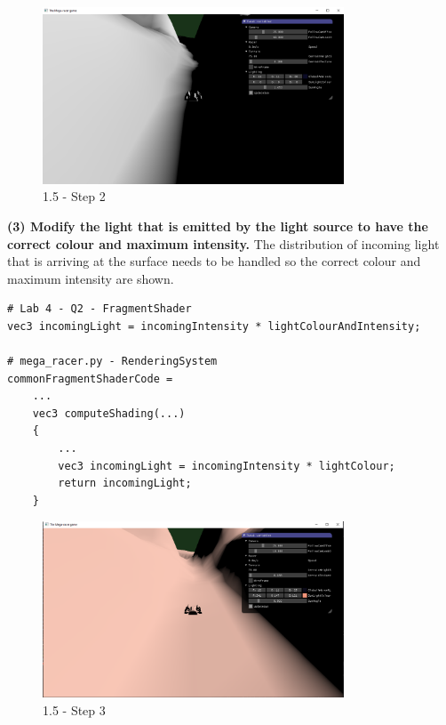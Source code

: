 \documentclass[a4 paper, 12pt]{article}
\begin{document}
    \begin{figure} [H]
        \centering
        \includegraphics[width=0.8\textwidth, frame]
            {./images/mega_racer/1.5_b.PNG}
        \caption{1.5 - Step 2}
    \end{figure}


\textbf{(3) Modify the light that is emitted by the light source to have the correct colour and maximum intensity.}
The distribution of incoming light that is arriving at the surface needs to be handled so the correct colour and maximum intensity are shown.
    \begin{lstlisting}
# Lab 4 - Q2 - FragmentShader
vec3 incomingLight = incomingIntensity * lightColourAndIntensity;

# mega_racer.py - RenderingSystem
commonFragmentShaderCode =
    ...
    vec3 computeShading(...)
    {
        ...
        vec3 incomingLight = incomingIntensity * lightColour;
        return incomingLight;
    }        
    \end{lstlisting}

    \begin{figure} [H]
        \centering
        \includegraphics[width=0.8\textwidth, frame]
            {./images/mega_racer/1.5_c.PNG}
        \caption{1.5 - Step 3}
    \end{figure}
    
\end{document}
